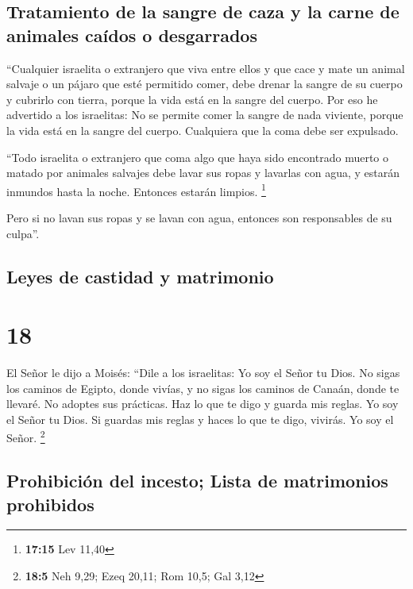 \hypertarget{tratamiento-de-la-sangre-de-caza-y-la-carne-de-animales-cauxeddos-o-desgarrados}{%
\subsection{Tratamiento de la sangre de caza y la carne de animales
caídos o
desgarrados}\label{tratamiento-de-la-sangre-de-caza-y-la-carne-de-animales-cauxeddos-o-desgarrados}}

 ``Cualquier israelita o extranjero que viva entre ellos
y que cace y mate un animal salvaje o un pájaro que esté permitido
comer, debe drenar la sangre de su cuerpo y cubrirlo con tierra,
 porque la vida está en la sangre del cuerpo. Por eso he
advertido a los israelitas: No se permite comer la sangre de nada
viviente, porque la vida está en la sangre del cuerpo. Cualquiera que la
coma debe ser expulsado.

 ``Todo israelita o extranjero que coma algo que haya
sido encontrado muerto o matado por animales salvajes debe lavar sus
ropas y lavarlas con agua, y estarán inmundos hasta la noche. Entonces
estarán limpios. \footnote{\textbf{17:15} Lev 11,40}

 Pero si no lavan sus ropas y se lavan con agua, entonces
son responsables de su culpa''.

\hypertarget{leyes-de-castidad-y-matrimonio}{%
\subsection{Leyes de castidad y
matrimonio}\label{leyes-de-castidad-y-matrimonio}}

\hypertarget{section-17}{%
\section{18}\label{section-17}}

 El Señor le dijo a Moisés:  ``Dile a los
israelitas: Yo soy el Señor tu Dios.  No sigas los caminos
de Egipto, donde vivías, y no sigas los caminos de Canaán, donde te
llevaré. No adoptes sus prácticas.  Haz lo que te digo y
guarda mis reglas. Yo soy el Señor tu Dios.  Si guardas
mis reglas y haces lo que te digo, vivirás. Yo soy el Señor. \footnote{\textbf{18:5}
  Neh 9,29; Ezeq 20,11; Rom 10,5; Gal 3,12}

\hypertarget{prohibiciuxf3n-del-incesto-lista-de-matrimonios-prohibidos}{%
\subsection{Prohibición del incesto; Lista de matrimonios
prohibidos}\label{prohibiciuxf3n-del-incesto-lista-de-matrimonios-prohibidos}}

